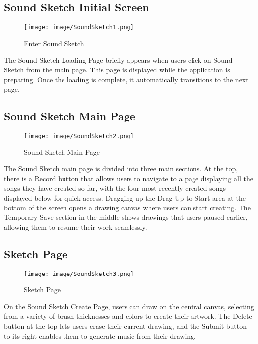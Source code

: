 \documentclass[conference]{IEEEtran}
\begin{document}
\subsection{Sound Sketch Initial Screen}
\begin{figure}[h!]
    \centering
    \texttt{[image: image/SoundSketch1.png]}
    \caption{Enter Sound Sketch}
    \label{fig:enter-label}
\end{figure}

\noindent The Sound Sketch Loading Page briefly appears when users click on Sound Sketch from the main page. This page is displayed while the application is preparing. Once the loading is complete, it automatically transitions to the next page.\\


\subsection{Sound Sketch Main Page}
\begin{figure}[h!]
    \centering
    \texttt{[image: image/SoundSketch2.png]}
    \caption{Sound Sketch Main Page }
    \label{fig:enter-label}
\end{figure}

\noindent The Sound Sketch main page is divided into three main sections. At the top, there is a Record button that allows users to navigate to a page displaying all the songs they have created so far, with the four most recently created songs displayed below for quick access. Dragging up the Drag Up to Start area at the bottom of the screen opens a drawing canvas where users can start creating. The Temporary Save section in the middle shows drawings that users paused earlier, allowing them to resume their work seamlessly.\\


\subsection{Sketch Page}
\begin{figure}[h!]
    \centering
    \texttt{[image: image/SoundSketch3.png]}
    \caption{Sketch Page}
    \label{fig:enter-label}
\end{figure}

\noindent On the Sound Sketch Create Page, users can draw on the central canvas, selecting from a variety of brush thicknesses and colors to create their artwork. The Delete button at the top lets users erase their current drawing, and the Submit button to its right enables them to generate music from their drawing.\\
\end{document}
